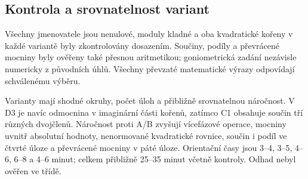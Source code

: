 \documentclass[a4paper,10pt]{article}
\begin{document}
\subsection*{Kontrola a srovnatelnost variant}
Všechny jmenovatele jsou nenulové, moduly kladné a oba kvadratické kořeny
v každé variantě byly zkontrolovány dosazením.
Součiny, podíly a převrácené mocniny byly ověřeny také přesnou aritmetikou;
goniometrická zadání nezávisle numericky z původních úhlů.
Všechny převzaté matematické výrazy odpovídají schválenému výběru.

Varianty mají shodné okruhy, počet úloh a přibližně srovnatelnou náročnost.
V D3 je navíc odmocnina v imaginární části kořenů, zatímco C1 obsahuje
součin tří různých dvojčlenů. Náročnost proti A/B zvyšují vícefázové
operace, mocniny uvnitř absolutní hodnoty, nenormované kvadratické rovnice,
součin i podíl ve čtvrté úloze a převrácené mocniny v páté úloze.
Orientační časy jsou 3--4, 3--5, 4--6, 6--8 a 4--6 minut;
celkem přibližně 25--35 minut včetně kontroly. Odhad nebyl ověřen ve třídě.
\end{document}

